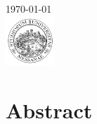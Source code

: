 \begin{titlepage}


{\large \today}\\[2cm] %


\includegraphics[width=70px, keepaspectratio]{unime.png}\\[1cm] %
 

\vfill %

\end{titlepage}

\tableofcontents
\pagebreak

\section{Abstract}
\pagebreak

